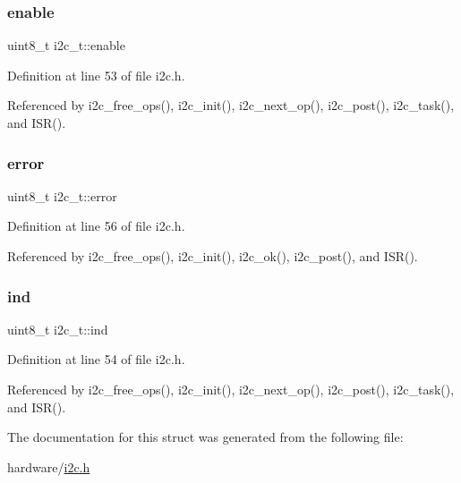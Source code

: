 \mbox{\label{structi2c__t_a4f93d346cc47b87d440b938474cc067c}} 
\subsubsection{\texorpdfstring{enable}{enable}}
{\footnotesize\ttfamily uint8\+\_\+t i2c\+\_\+t\+::enable}



Definition at line 53 of file i2c.\+h.



Referenced by i2c\+\_\+free\+\_\+ops(), i2c\+\_\+init(), i2c\+\_\+next\+\_\+op(), i2c\+\_\+post(), i2c\+\_\+task(), and I\+S\+R().

\mbox{\label{structi2c__t_a8d7082575277088bb81918df8d3990f8}} 
\subsubsection{\texorpdfstring{error}{error}}
{\footnotesize\ttfamily uint8\+\_\+t i2c\+\_\+t\+::error}



Definition at line 56 of file i2c.\+h.



Referenced by i2c\+\_\+free\+\_\+ops(), i2c\+\_\+init(), i2c\+\_\+ok(), i2c\+\_\+post(), and I\+S\+R().

\mbox{\label{structi2c__t_a3d1592ac8ecc86a8f71fe593b29488b2}} 
\subsubsection{\texorpdfstring{ind}{ind}}
{\footnotesize\ttfamily uint8\+\_\+t i2c\+\_\+t\+::ind}



Definition at line 54 of file i2c.\+h.



Referenced by i2c\+\_\+free\+\_\+ops(), i2c\+\_\+init(), i2c\+\_\+next\+\_\+op(), i2c\+\_\+post(), i2c\+\_\+task(), and I\+S\+R().



The documentation for this struct was generated from the following file\+:\begin{DoxyCompactItemize}
\item 
hardware/\hyperlink{i2c_8h}{i2c.\+h}\end{DoxyCompactItemize}
